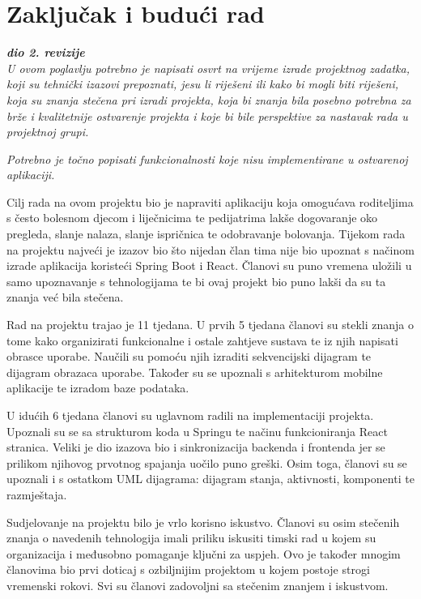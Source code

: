 \chapter{Zaključak i budući rad}
		
		\textbf{\textit{dio 2. revizije}}\\
		
		 \textit{U ovom poglavlju potrebno je napisati osvrt na vrijeme izrade projektnog zadatka, koji su tehnički izazovi prepoznati, jesu li riješeni ili kako bi mogli biti riješeni, koja su znanja stečena pri izradi projekta, koja bi znanja bila posebno potrebna za brže i kvalitetnije ostvarenje projekta i koje bi bile perspektive za nastavak rada u projektnoj grupi.}
		
		 \textit{Potrebno je točno popisati funkcionalnosti koje nisu implementirane u ostvarenoj aplikaciji.}
		 
		 Cilj rada na ovom projektu bio je napraviti aplikaciju koja omogućava roditeljima s često bolesnom djecom i liječnicima te pedijatrima lakše dogovaranje oko pregleda, slanje nalaza, slanje ispričnica te odobravanje bolovanja. Tijekom rada na projektu najveći je izazov bio što nijedan član tima nije bio upoznat s načinom izrade aplikacija koristeći Spring Boot i React. Članovi su puno vremena uložili u samo upoznavanje s tehnologijama te bi ovaj projekt bio puno lakši da su ta znanja već bila stečena. 
		 
		 Rad na projektu trajao je 11 tjedana. U prvih 5 tjedana članovi su stekli znanja o tome kako organizirati funkcionalne i ostale zahtjeve sustava te iz njih napisati obrasce uporabe. Naučili su pomoću njih izraditi sekvencijski dijagram te dijagram obrazaca uporabe. Također su se upoznali s arhitekturom mobilne aplikacije te izradom baze podataka.
		 
		 U idućih 6 tjedana članovi su uglavnom radili na implementaciji projekta. Upoznali su se sa strukturom koda u Springu te načinu funkcioniranja React stranica. Veliki je dio izazova bio i sinkronizacija backenda i frontenda jer se prilikom njihovog prvotnog spajanja uočilo puno greški. Osim toga, članovi su se upoznali i s ostatkom UML dijagrama: dijagram stanja, aktivnosti, komponenti te razmještaja.
		 
		 Sudjelovanje na projektu bilo je vrlo korisno iskustvo. Članovi su osim stečenih znanja o navedenih tehnologija imali priliku iskusiti timski rad u kojem su organizacija i međusobno pomaganje ključni za uspjeh. Ovo je također mnogim članovima bio prvi doticaj s ozbiljnijim projektom u kojem postoje strogi vremenski rokovi. Svi su članovi zadovoljni sa stečenim znanjem i iskustvom.
		
		\eject 